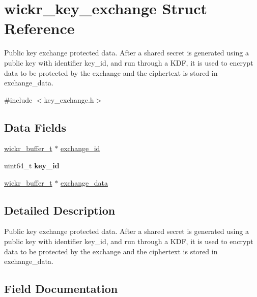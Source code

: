 \hypertarget{structwickr__key__exchange}{}\section{wickr\+\_\+key\+\_\+exchange Struct Reference}
\label{structwickr__key__exchange}


Public key exchange protected data. After a shared secret is generated using a public key with identifier \textquotesingle{}key\+\_\+id\textquotesingle{}, and run through a K\+DF, it is used to encrypt data to be protected by the exchange and the ciphertext is stored in \textquotesingle{}exchange\+\_\+data\textquotesingle{}.  




{\ttfamily \#include $<$key\+\_\+exchange.\+h$>$}

\subsection*{Data Fields}
\begin{DoxyCompactItemize}
\item 
\mbox{\hyperlink{structwickr__buffer}{wickr\+\_\+buffer\+\_\+t}} $\ast$ \mbox{\hyperlink{structwickr__key__exchange_a744e71ef6676c78643646adf1693a4e5}{exchange\+\_\+id}}
\item 
\mbox{\label{structwickr__key__exchange_a109d595a115ac08ca570545f3751686b}} 
uint64\+\_\+t {\bfseries key\+\_\+id}
\item 
\mbox{\hyperlink{structwickr__buffer}{wickr\+\_\+buffer\+\_\+t}} $\ast$ \mbox{\hyperlink{structwickr__key__exchange_a6be89562df814a32b19cd57c49037691}{exchange\+\_\+data}}
\end{DoxyCompactItemize}


\subsection{Detailed Description}
Public key exchange protected data. After a shared secret is generated using a public key with identifier \textquotesingle{}key\+\_\+id\textquotesingle{}, and run through a K\+DF, it is used to encrypt data to be protected by the exchange and the ciphertext is stored in \textquotesingle{}exchange\+\_\+data\textquotesingle{}. 

\subsection{Field Documentation}
\mbox{\label{structwickr__key__exchange_a6be89562df814a32b19cd57c49037691}} 
